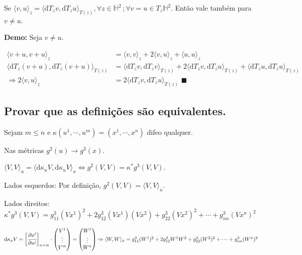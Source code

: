 \documentclass[10pt,a4paper]{article}
\begin{document}
		Se $\langle v, u \rangle_z = \langle \mathrm{d}T_z v, \mathrm{d}T_z u \rangle_{T(z)}, \forall z \in \mathbb{H}^2\,; \forall v = u \in T_z\mathbb{H}^2$. Ent\~ao vale tamb\'em para $v \ne u$.

		\textbf{Demo:} Seja $v \ne u$.

		\begin{align*}
		\langle v + u, v + u \rangle_z &= \langle v, v \rangle_z + 2 \langle v, u \rangle_z + \langle u, u \rangle_z \\
		\langle \mathrm{d}T_z (v+u), \mathrm{d}T_z (v+u) \rangle_{T(z)} &= \langle \mathrm{d}T_z v, \mathrm{d}T_z v \rangle_{T(z)} + 2 \langle \mathrm{d}T_z v, \mathrm{d}T_z u \rangle_{T(z)} + \langle \mathrm{d}T_z u, \mathrm{d}T_z u \rangle_{T(z)} \\
		\Rightarrow 2 \langle v, u \rangle_z &= 2 \langle \mathrm{d}T_z v, \mathrm{d}T_z u \rangle_{T(z)}\,\,\blacksquare
		\end{align*}

		\subsection{Provar que as defini\c{c}\~oes s\~ao equivalentes.}
		\begin{flushright}
		\end{flushright}

		Sejam $m \le n$ e $\kappa(u^1,\cdots,u^m) = (x^1,\cdots,x^n)$ difeo qualquer.

		Nas m\'etricas $g^2(u) \rightarrow g^3(x)$.

		\vspace{3mm}

		$\langle V, V \rangle_u = \langle \mathrm{d}\kappa_u V, \mathrm{d}\kappa_u V \rangle_x \Leftrightarrow g^2(V,V) = \kappa^* g^3(V,V)$.

		Lados esquerdos: Por defini\c{c}\~ao, $g^2(V, V) = \langle V, V \rangle_u$.

		Lados direitos: $\kappa^* g^3(V,V) = g_{11}^3 (Vx^1)^2 + 2 g_{12}^3 (Vx^1) (Vx^2) + g_{22}^3 (Vx^2)^2 + \cdots + g_{nn}^3 (Vx^n)^2$

		$\mathrm{d}\kappa_u V = \bigg[ \cfrac{\partial x^i}{\partial u^j} \bigg]_{n \times m} \cdot \left( \begin{matrix} V^1 \\ \vdots \\ V^m \end{matrix} \right) = \left( \begin{matrix} W^1 \\ \vdots \\ W^n \end{matrix} \right) \Rightarrow \langle W, W \rangle_x = g_{11}^3 (W^1)^2 + 2 g_{12}^3 W^1 W^2 + g_{22}^3 (W^2)^2 + \cdots + g_{nn}^3 (W^n)^2$
\end{document}

